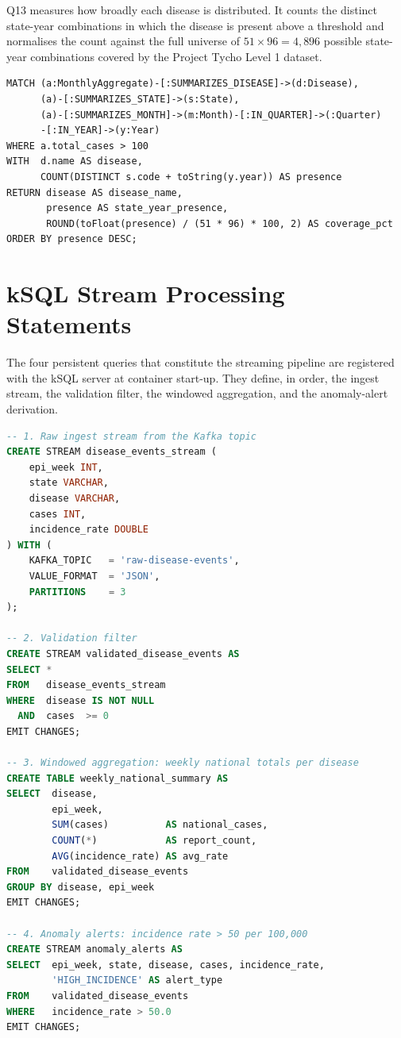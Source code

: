 \documentclass[12pt,a4paper]{article}
\begin{document}
Q13 measures how broadly each disease is distributed. It counts the distinct state-year combinations in which the disease is present above a threshold and normalises the count against the full universe of $51 \times 96 = 4{,}896$ possible state-year combinations covered by the Project Tycho Level 1 dataset.

\begin{lstlisting}[language=cypher, caption={Q13: Neo4j. A single \texttt{COUNT(DISTINCT \dots)} per disease over the state/year space.}]
MATCH (a:MonthlyAggregate)-[:SUMMARIZES_DISEASE]->(d:Disease),
      (a)-[:SUMMARIZES_STATE]->(s:State),
      (a)-[:SUMMARIZES_MONTH]->(m:Month)-[:IN_QUARTER]->(:Quarter)
      -[:IN_YEAR]->(y:Year)
WHERE a.total_cases > 100
WITH  d.name AS disease,
      COUNT(DISTINCT s.code + toString(y.year)) AS presence
RETURN disease AS disease_name,
       presence AS state_year_presence,
       ROUND(toFloat(presence) / (51 * 96) * 100, 2) AS coverage_pct
ORDER BY presence DESC;
\end{lstlisting}

\lstset{basicstyle=\ttfamily\small}


\section{kSQL Stream Processing Statements}
\label{app:ksql}

The four persistent queries that constitute the streaming pipeline are registered with the kSQL server at container start-up. They define, in order, the ingest stream, the validation filter, the windowed aggregation, and the anomaly-alert derivation.

\begin{lstlisting}[language=SQL, caption={kSQL pipeline statements (\texttt{ksql/statements.sql}).}]
-- 1. Raw ingest stream from the Kafka topic
CREATE STREAM disease_events_stream (
    epi_week INT,
    state VARCHAR,
    disease VARCHAR,
    cases INT,
    incidence_rate DOUBLE
) WITH (
    KAFKA_TOPIC   = 'raw-disease-events',
    VALUE_FORMAT  = 'JSON',
    PARTITIONS    = 3
);

-- 2. Validation filter
CREATE STREAM validated_disease_events AS
SELECT *
FROM   disease_events_stream
WHERE  disease IS NOT NULL
  AND  cases  >= 0
EMIT CHANGES;

-- 3. Windowed aggregation: weekly national totals per disease
CREATE TABLE weekly_national_summary AS
SELECT  disease,
        epi_week,
        SUM(cases)          AS national_cases,
        COUNT(*)            AS report_count,
        AVG(incidence_rate) AS avg_rate
FROM    validated_disease_events
GROUP BY disease, epi_week
EMIT CHANGES;

-- 4. Anomaly alerts: incidence rate > 50 per 100,000
CREATE STREAM anomaly_alerts AS
SELECT  epi_week, state, disease, cases, incidence_rate,
        'HIGH_INCIDENCE' AS alert_type
FROM    validated_disease_events
WHERE   incidence_rate > 50.0
EMIT CHANGES;
\end{lstlisting}
\end{document}

